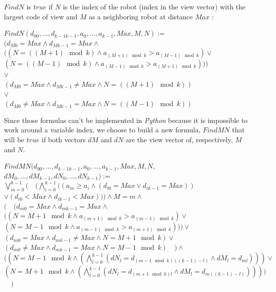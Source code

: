 \documentclass{article}
\begin{document}
$FindN$ is $true$ if $N$ is the index of the robot (index in the view vector) with the largest code of view and $M$ as a neighboring robot at distance $Max$ :

\begin{center}

$FindN(d_{00}, \ldots ,d_{k-1k-1}, a_{0}, \ldots , a_{k-1}, Max, M, N):=$\\
$(d_{M0} = Max \land d_{Mk-1} = Max \land $\\
$( (N = ((M+1) \mod{k}) \land a_{(M+1) \mod{k}} > a_{(M-1) \mod{k}}) \lor $\\
$(N = ((M-1) \mod{k}) \land a_{(M-1) \mod{k}} > a_{(M+1) \mod{k}})))$\\
$ \lor$\\
$(d_{M0} = Max \land d_{Mk-1} \not= Max \land N = ((M+1)\mod{k}))$\\
$ \lor$\\
$(d_{M0} \not= Max \land d_{Mk-1} = Max \land N = ((M-1)\mod{k}))$
\end{center}

Since those formulas can't be implemented in \textit{Python} because it is impossible to work around a variable index, we choose to build a new formula, $FindMN$ that will be $true$ if both vectors $dM$ and $dN$ are the view vector of, respectively, $M$ and $N$.

\begin{center}

$FindMN(d_{00}, \ldots ,d_{k-1k-1}, a_{0}, \ldots , a_{k-1}, Max, M, N,$\\
$ dM_{0}, \dots, dM_{k-1}, dN_{0}, \dots, dN_{k-1}):=$\\
$\bigvee_{m=0}^{k-1}(\quad
(\bigwedge_{i=0}^{k-1} ((a_{m} \geq a_i \land (d_{i0} = Max \lor d_{ik-1} = Max))$\\
$\lor (d_{i0} < Max \land d_{ik-1} < Max))) \land M = m \land $\\ 
$(\quad (
d_{m0} = Max \land d_{mk-1} = Max \land $\\
$( ( N = M+1 \mod k \land a_{(m+1) \mod{k}} > a_{(m-1) \mod{k}}) \lor $\\
$( N = M-1 \mod{k} \land a_{(m-1) \mod{k}} > a_{(m+1) \mod{k}}))
)\lor $\\
$(
d_{m0} = Max \land d_{mk-1} \not= Max \land N = M+1 \mod k
) \lor$\\
$(
d_{m0} \not= Max \land d_{mk-1} = Max \land N = M-1 \mod{k}
)\quad ) \land $\\
$( (N = M-1\mod{k} \land (\bigwedge_{l = 0}^{k-1} (dN_{l} = d_{(m-1 \mod{k}) ((k-1)-l)} \land dM_{l} = d_{ml}) ) ) \lor $\\
$(N = M+1\mod{k} \land (\bigwedge_{l = 0}^{k-1} (dN_{l} = d_{(m+1 \mod{k})l} \land dM_{l} = d_{m((k-1)-l)}) ) ) )$
$\quad )$
\end{center}
\end{document}
